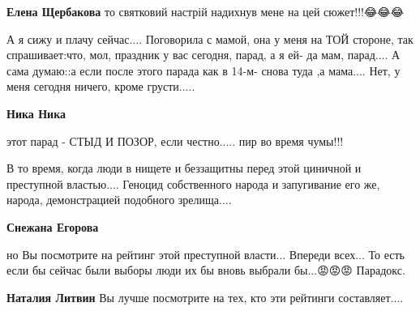 \begin{itemize}
\begin{itemize}
\textbf{Елена Щербакова} то святковий настрій надихнув мене на цей сюжет!!!😂😂😂

 

А я сижу и плачу сейчас.... Поговорила с мамой, она у меня на ТОЙ стороне, так
спрашивает:что, мол, праздник у вас сегодня, парад, а я ей- да мам, парад.... А сама
думаю::а если после этого парада как в 14-м- снова туда ,а мама.... Нет, у меня
сегодня ничего, кроме грусти.....



 
\textbf{Ника Ника} 

этот парад - СТЫД И ПОЗОР, если честно..... пир во время чумы!!!

В то время, когда люди в нищете и беззащитны перед этой циничной и преступной
властью.... Геноцид собственного народа и запугивание его же, народа,
демонстрацией подобного зрелища....

 
\textbf{Снежана Егорова} 

но Вы посмотрите на рейтинг этой преступной
власти... Впереди всех... То есть если бы сейчас были выборы люди их бы вновь
выбрали бы...😡😡😡 Парадокс.



 
\textbf{Наталия Литвин} Вы лучше посмотрите на тех, кто эти рейтинги составляет....

 

\end{itemize}
\end{itemize}
